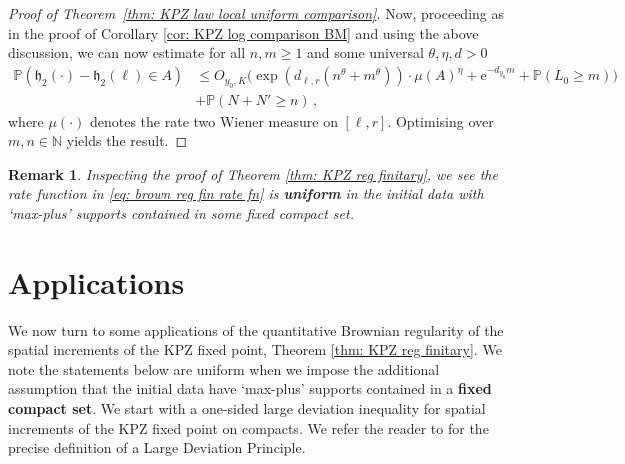 \documentclass[11pt, reqno]{amsart}
\numberwithin{equation}{section}
\newtheorem*{remark}{Remark}
\newcommand{\N}{\ensuremath{\mathbb{N}}}
\newcommand{\PP}{\ensuremath{\mathbb{P}}}
\begin{document}
\begin{proof}[Proof of Theorem~\ref{thm: KPZ law local uniform comparison}]
Now, proceeding as in the proof of Corollary \ref{cor: KPZ log comparison BM} and using the above discussion, we can now estimate for all $n, m \ge 1$ and some universal $\theta, \eta, d >0$
\begin{align*}
    \PP(\mathfrak{h}_2(\cdot)-\mathfrak{h}_2(\ell)\in A) &\le  \displaystyle O_{y_0, K}\bigg(\exp(d_{\ell, r} (n^\theta + m^\theta))\cdot \mu(A)^{\eta}+ \mathrm{e}^{-d_{y_0} m} +  \PP(L_0\geq m)\bigg)\\
    &+\PP(N+N'\ge n)\,,
\end{align*}
where $\mu(\cdot)$ denotes the rate two Wiener measure on $[\ell, r]$. Optimising over $m, n \in \N$ yields the result.
\end{proof}

\begin{remark}
    Inspecting the proof of Theorem \ref{thm: KPZ reg finitary}, we see the rate function in \eqref{eq: brown reg fin rate fn} is \textbf{uniform} in the initial data with `max-plus' supports contained in some fixed compact set.
\end{remark}

\section{Applications}\label{sec: applications}

We now turn to some applications of the quantitative Brownian regularity of the spatial increments of the KPZ fixed point, Theorem \ref{thm: KPZ reg finitary}. We note the statements below are uniform when we impose the additional assumption that the initial data have `max-plus' supports contained in a \textbf{fixed compact set}.
We start with a one-sided large deviation inequality for spatial increments of the KPZ fixed point on compacts. We refer the reader to \cite{deuschel1989large} for the precise definition of a Large Deviation Principle.
\end{document}

